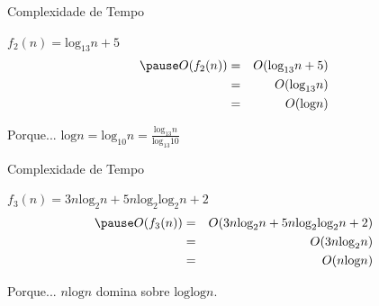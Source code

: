 \documentclass[xcolor=dvipsnames,table]{beamer}
\begin{document}
	\begin{frame}{Complexidade de Tempo}
		\begin{block}{$f_2 (n) = \mbox{log}_{13} n + 5$}
			\begin{eqnarray} \pause
				O(f_2(n)) & = & O(\mbox{log}_{13} n + 5)\\
						  & = & O(\mbox{log}_{13} n)\\
						  & = & O(\mbox{log} n)
			\end{eqnarray}
		\end{block} \pause
		\begin{exampleblock}{Porque...}
			$\mbox{log} n = \mbox{log}_{10} n  = \frac{\mbox{log}_{13} n}{\mbox{log}_{13} 10}$
		\end{exampleblock}
	\end{frame}
	
	\begin{frame}{Complexidade de Tempo}
		\begin{block}{$f_3 (n) =  3n \mbox{log}_2 n + 5n \mbox{log}_2 \mbox{log}_2 n + 2$}
			\begin{eqnarray} \pause
				O(f_3(n)) & = & O(3n \mbox{log}_2 n + 5n \mbox{log}_2 \mbox{log}_2 n + 2)\\
						  & = & O(3n \mbox{log}_2 n)\\
						  & = & O(n \mbox{log} n)
			\end{eqnarray}
		\end{block} \pause
		\begin{exampleblock}{Porque...}
			$n \mbox{log} n$ domina sobre $\mbox{log} \mbox{log} n$.
		\end{exampleblock}
	\end{frame}
	
	\begin{frame}
		\titlepage
	\end{frame}
	
\end{document}

